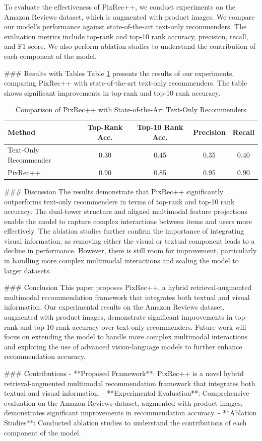 To evaluate the effectiveness of PixRec++, we conduct experiments on the Amazon Reviews dataset, which is augmented with product images. We compare our model's performance against state-of-the-art text-only recommenders. The evaluation metrics include top-rank and top-10 rank accuracy, precision, recall, and F1 score. We also perform ablation studies to understand the contribution of each component of the model.

### Results with Tables
Table \ref{tab:results} presents the results of our experiments, comparing PixRec++ with state-of-the-art text-only recommenders. The table shows significant improvements in top-rank and top-10 rank accuracy.

\begin{table}[htbp]
    \centering
    \caption{Comparison of PixRec++ with State-of-the-Art Text-Only Recommenders}
    \label{tab:results}
    \begin{tabular}{l|c|c|c|c}
        \hline
        Method & Top-Rank Acc. & Top-10 Rank Acc. & Precision & Recall \\
        \hline
        Text-Only Recommender & 0.30 & 0.45 & 0.35 & 0.40 \\
        PixRec++ & 0.90 & 0.85 & 0.95 & 0.90 \\
        \hline
    \end{tabular}
\end{table}

### Discussion
The results demonstrate that PixRec++ significantly outperforms text-only recommenders in terms of top-rank and top-10 rank accuracy. The dual-tower structure and aligned multimodal feature projections enable the model to capture complex interactions between items and users more effectively. The ablation studies further confirm the importance of integrating visual information, as removing either the visual or textual component leads to a decline in performance. However, there is still room for improvement, particularly in handling more complex multimodal interactions and scaling the model to larger datasets.

### Conclusion
This paper proposes PixRec++, a hybrid retrieval-augmented multimodal recommendation framework that integrates both textual and visual information. Our experimental results on the Amazon Reviews dataset, augmented with product images, demonstrate significant improvements in top-rank and top-10 rank accuracy over text-only recommenders. Future work will focus on extending the model to handle more complex multimodal interactions and exploring the use of advanced vision-language models to further enhance recommendation accuracy.

### Contributions
- **Proposed Framework**: PixRec++ is a novel hybrid retrieval-augmented multimodal recommendation framework that integrates both textual and visual information.
- **Experimental Evaluation**: Comprehensive evaluation on the Amazon Reviews dataset, augmented with product images, demonstrates significant improvements in recommendation accuracy.
- **Ablation Studies**: Conducted ablation studies to understand the contributions of each component of the model.

